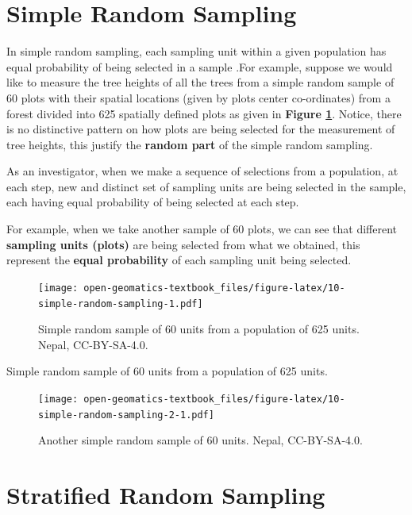\documentclass[
]{book}
\begin{document}
\hypertarget{simple-random-sampling}{%
\section{Simple Random Sampling}\label{simple-random-sampling}}

In simple random sampling, each sampling unit within a given population has equal probability of being selected in a sample \citep{thompson_sampling_2012}.For example, suppose we would like to measure the tree heights of all the trees from a simple random sample of 60 plots with their spatial locations (given by plots center co-ordinates) from a forest divided into 625 spatially defined plots as given in \textbf{Figure \ref{fig:10-simple-random-sampling}}. Notice, there is no distinctive pattern on how plots are being selected for the measurement of tree heights, this justify the \textbf{random part} of the simple random sampling.

As an investigator, when we make a sequence of selections from a population, at each step, new and distinct set of sampling units are being selected in the sample, each having equal probability of being selected at each step.

For example, when we take another sample of 60 plots, we can see that different \textbf{sampling units (plots)} are being selected from what we obtained, this represent the \textbf{equal probability} of each sampling unit being selected.

\begin{figure}
\centering
\texttt{[image: open-geomatics-textbook\_files/figure-latex/10-simple-random-sampling-1.pdf]}
\caption{\label{fig:10-simple-random-sampling}Simple random sample of 60 units from a population of 625 units. Nepal, CC-BY-SA-4.0.}
\end{figure}

Simple random sample of 60 units from a population of 625 units.

\begin{figure}
\centering
\texttt{[image: open-geomatics-textbook\_files/figure-latex/10-simple-random-sampling-2-1.pdf]}
\caption{\label{fig:10-simple-random-sampling-2}Another simple random sample of 60 units. Nepal, CC-BY-SA-4.0.}
\end{figure}

\hypertarget{stratified-random-sampling}{%
\section{Stratified Random Sampling}\label{stratified-random-sampling}}
\end{document}
